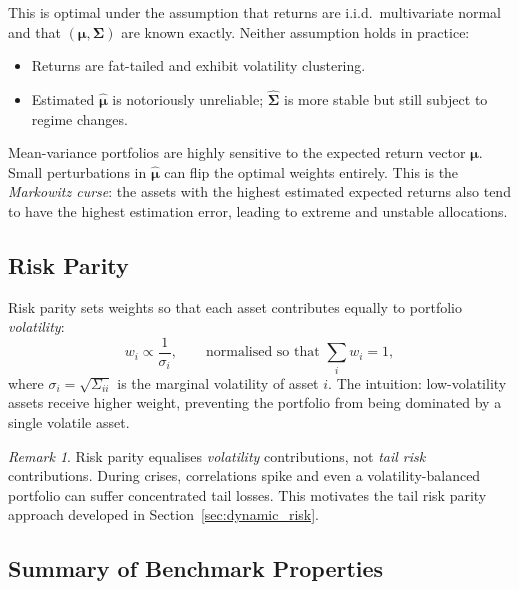 \documentclass[11pt, a4paper]{article}
\theoremstyle{definition}
\theoremstyle{plain}
\theoremstyle{remark}
\newtheorem{remark}{Remark}[section]
\begin{document}
This is optimal under the assumption that returns are i.i.d.\ multivariate
normal and that $(\bm{\mu}, \bm{\Sigma})$ are known exactly. Neither
assumption holds in practice:
\begin{itemize}[leftmargin=2em]
    \item Returns are fat-tailed and exhibit volatility clustering.
    \item Estimated $\hat{\bm{\mu}}$ is notoriously unreliable;
          $\hat{\bm{\Sigma}}$ is more stable but still subject to
          regime changes.
\end{itemize}

\begin{warningbox}
Mean-variance portfolios are highly sensitive to the expected return
vector $\bm{\mu}$. Small perturbations in $\hat{\bm{\mu}}$ can flip
the optimal weights entirely. This is the \emph{Markowitz curse}: the
assets with the highest estimated expected returns also tend to have the
highest estimation error, leading to extreme and unstable allocations.
\end{warningbox}

\subsection{Risk Parity}

Risk parity sets weights so that each asset contributes equally to
portfolio \emph{volatility}:
\begin{equation}
    w_i \propto \frac{1}{\sigma_i},
    \qquad \text{normalised so that } \sum_i w_i = 1,
    \label{eq:risk_parity}
\end{equation}
where $\sigma_i = \sqrt{\Sigma_{ii}}$ is the marginal volatility of
asset $i$. The intuition: low-volatility assets receive higher weight,
preventing the portfolio from being dominated by a single volatile asset.

\begin{remark}
Risk parity equalises \emph{volatility} contributions, not
\emph{tail risk} contributions. During crises, correlations spike and
even a volatility-balanced portfolio can suffer concentrated tail losses.
This motivates the tail risk parity approach developed in
Section~\ref{sec:dynamic_risk}.
\end{remark}

\subsection{Summary of Benchmark Properties}
\end{document}
